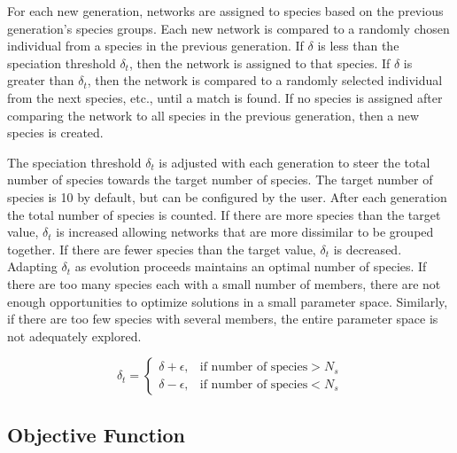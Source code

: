 \documentclass[12pt]{report}
\begin{document}
For each new generation, networks are assigned to species based on the previous generation's species groups. Each new network is compared to a randomly chosen individual from a species in the previous generation. If $\delta$ is less than the speciation threshold $\delta_{t}$, then the network is assigned to that species. If $\delta$ is greater than $\delta_{t}$, then the network is compared to a randomly selected individual from the next species, etc., until a match is found. If no species is assigned after comparing the network to all species in the previous generation, then a new species is created. 

The speciation threshold $\delta_{t}$ is adjusted with each generation to steer the total number of species towards the target number of species. The target number of species is 10 by default, but can be configured by the user. After each generation the total number of species is counted. If there are more species than the target value, $\delta_{t}$ is increased allowing networks that are more dissimilar to be grouped together. If there are fewer species than the target value, $\delta_{t}$ is decreased. Adapting $\delta_{t}$ as evolution proceeds maintains an optimal number of species. If there are too many species each with a small number of members, there are not enough opportunities to optimize solutions in a small parameter space. Similarly, if there are too few species with several members, the entire parameter space is not adequately explored. 

\begin{equation}
	\delta_{t} = \begin{cases}\delta+\epsilon,& \mbox{if number of species} > N_{s} \\
	\delta-\epsilon,& \mbox{if number of species} < N_{s}
	\end{cases}
\end{equation}

\subsection{Objective Function}
\end{document}
